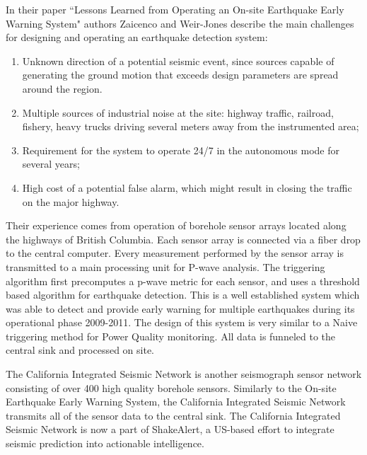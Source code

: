 In their paper ``Lessons Learned from Operating an On-site Earthquake Early Warning System"\cite{zaicenco2012lessons} authors Zaicenco and Weir-Jones describe the main challenges for designing and operating an earthquake detection system:
\begin{enumerate}
    \item Unknown direction of a potential seismic event, since sources capable of generating
    the ground motion that exceeds design parameters are spread around the region.
    \item Multiple sources of industrial noise at the site: highway traffic, railroad, fishery, heavy trucks
    driving several meters away from the instrumented area;
    \item Requirement for the system to operate 24/7 in the autonomous mode for several years;
    \item High cost of a potential false alarm, which might result in closing the traffic on the major
    highway.
\end{enumerate}

Their experience comes from operation of borehole sensor arrays located along the highways of British Columbia.
Each sensor array is connected via a fiber drop to the central computer.
Every measurement performed by the sensor array is transmitted to a main processing unit for P-wave analysis.
The triggering algorithm first precomputes a p-wave metric for each sensor, and uses a threshold based algorithm for earthquake detection.
This is a well established system which was able to detect and provide early warning for multiple earthquakes during its operational phase 2009-2011.
The design of this system is very similar to a Naive triggering method for Power Quality monitoring.
All data is funneled to the central sink and processed on site.

The California Integrated Seismic Network is another seismograph sensor network consisting of over 400 high quality borehole sensors.\cite{uhrhammer2011california}
Similarly to the On-site Earthquake Early Warning System, the California Integrated Seismic Network transmits all of the sensor data to the central sink.
The California Integrated Seismic Network is now a part of ShakeAlert, a US-based effort to integrate seismic prediction into actionable intelligence.

